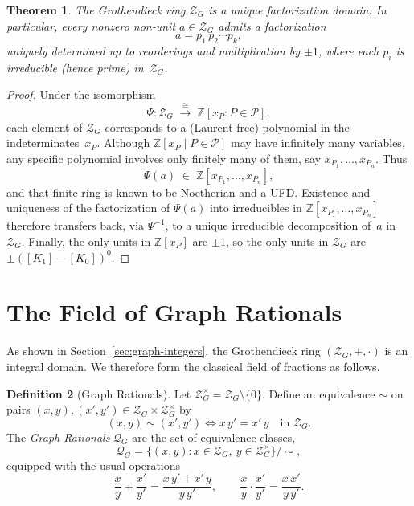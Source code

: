 \documentclass[11pt]{article}
\theoremstyle{definition}
\newtheorem{definition}{Definition}[section]
\theoremstyle{plain}
\newtheorem{theorem}[definition]{Theorem}
\theoremstyle{remark}
\begin{document}
\begin{theorem}
  The Grothendieck ring $\mathcal Z_G$ is a \emph{unique factorization domain}.  In particular, every nonzero non‐unit $a\in\mathcal Z_G$ admits a factorization
  \[
    a = p_1\,p_2\cdots p_k,
  \]
  uniquely determined up to reorderings and multiplication by $\pm1$, where each $p_i$ is irreducible (hence prime) in~$\mathcal Z_G$.
\end{theorem}
\begin{proof}
Under the isomorphism
\[
  \Psi:\mathcal Z_G \;\xrightarrow{\;\cong\;}\;\mathbb Z[x_P : P\in\mathcal P],
\]
each element of $\mathcal Z_G$ corresponds to a (Laurent‐free) polynomial in the indeterminates~$x_P$.
Although $\mathbb Z[x_P\mid P\in\mathcal P]$ may have infinitely many variables, any specific polynomial involves only finitely many of them, say $x_{P_1},\dots,x_{P_n}$.  Thus
\[
  \Psi(a)\;\in\;\mathbb Z[x_{P_1},\dots,x_{P_n}],
\]
and that finite ring is known to be Noetherian and a UFD.  Existence and uniqueness of the factorization of $\Psi(a)$ into irreducibles in $\mathbb Z[x_{P_1},\dots,x_{P_n}]$ therefore transfers back, via $\Psi^{-1}$, to a unique irreducible decomposition of~$a$ in~$\mathcal Z_G$.  Finally, the only units in $\mathbb Z[x_P]$ are $\pm1$, so the only units in $\mathcal Z_G$ are $\pm([K_1]-[K_0])^0$.
\end{proof}

\section{The Field of Graph Rationals}
\label{sec:graph-rationals}

As shown in Section~\ref{sec:graph-integers}, the Grothendieck ring
$(\mathcal{Z}_G,+,\cdot)$ is an integral domain.  We therefore form
the classical field of fractions as follows.

\begin{definition}[Graph Rationals]
Let
$\mathcal{Z}_G^{\times}=\mathcal{Z}_G\setminus\{0\}$.  Define an
equivalence \(\sim\) on pairs
\((x,y),(x',y')\in\mathcal{Z}_G\times\mathcal{Z}_G^{\times}\) by
\[
  (x,y)\sim(x',y') \iff x\,y'=x'\,y
  \quad\text{in }\mathcal{Z}_G.
\]
The \emph{Graph Rationals}
\(\mathcal{Q}_G\) are the set of equivalence classes,
\[
  \mathcal{Q}_G
  =\bigl\{(x,y):x\in\mathcal{Z}_G,\ y\in\mathcal{Z}_G^{\times}\bigr\}/\sim,
\]
equipped with the usual operations
\[
  \frac{x}{y}+\frac{x'}{y'}
  =\frac{x\,y'+x'\,y}{y\,y'},
  \qquad
  \frac{x}{y}\cdot\frac{x'}{y'}
  =\frac{x\,x'}{y\,y'}.
\]
\end{definition}
\end{document}
